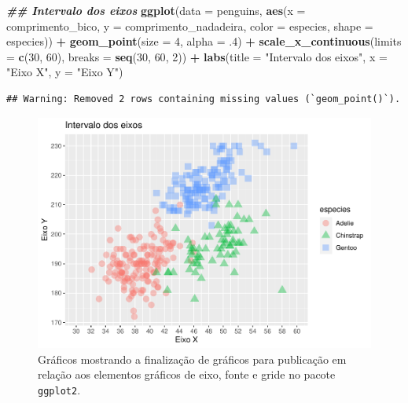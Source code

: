 \documentclass[
]{article}
\newenvironment{Shaded}{\begin{snugshade}}{\end{snugshade}}
\newcommand{\AttributeTok}[1]{\textcolor[rgb]{0.13,0.29,0.53}{#1}}
\newcommand{\DecValTok}[1]{\textcolor[rgb]{0.00,0.00,0.81}{#1}}
\newcommand{\DocumentationTok}[1]{\textcolor[rgb]{0.56,0.35,0.01}{\textbf{\textit{#1}}}}
\newcommand{\FunctionTok}[1]{\textcolor[rgb]{0.13,0.29,0.53}{\textbf{#1}}}
\newcommand{\NormalTok}[1]{#1}
\newcommand{\SpecialCharTok}[1]{\textcolor[rgb]{0.81,0.36,0.00}{\textbf{#1}}}
\newcommand{\StringTok}[1]{\textcolor[rgb]{0.31,0.60,0.02}{#1}}
\begin{document}
\begin{Shaded}
\begin{Highlighting}[]
\DocumentationTok{\#\# Intervalo dos eixos}
\FunctionTok{ggplot}\NormalTok{(}\AttributeTok{data =}\NormalTok{ penguins, }
       \FunctionTok{aes}\NormalTok{(}\AttributeTok{x =}\NormalTok{ comprimento\_bico, }\AttributeTok{y =}\NormalTok{ comprimento\_nadadeira,}
           \AttributeTok{color =}\NormalTok{ especies, }\AttributeTok{shape =}\NormalTok{ especies)) }\SpecialCharTok{+}
    \FunctionTok{geom\_point}\NormalTok{(}\AttributeTok{size =} \DecValTok{4}\NormalTok{, }\AttributeTok{alpha =}\NormalTok{ .}\DecValTok{4}\NormalTok{) }\SpecialCharTok{+}
    \FunctionTok{scale\_x\_continuous}\NormalTok{(}\AttributeTok{limits =} \FunctionTok{c}\NormalTok{(}\DecValTok{30}\NormalTok{, }\DecValTok{60}\NormalTok{), }\AttributeTok{breaks =} \FunctionTok{seq}\NormalTok{(}\DecValTok{30}\NormalTok{, }\DecValTok{60}\NormalTok{, }\DecValTok{2}\NormalTok{)) }\SpecialCharTok{+}
    \FunctionTok{labs}\NormalTok{(}\AttributeTok{title =} \StringTok{"Intervalo dos eixos"}\NormalTok{, }\AttributeTok{x =} \StringTok{"Eixo X"}\NormalTok{, }\AttributeTok{y =} \StringTok{"Eixo Y"}\NormalTok{)}
\end{Highlighting}
\end{Shaded}

\begin{verbatim}
## Warning: Removed 2 rows containing missing values (`geom_point()`).
\end{verbatim}

\begin{figure}
\centering
\includegraphics{epr_files/figure-latex/fig-plot-final-eixos-2.pdf}
\caption{\label{fig:fig-plot-final-eixos-2}Gráficos mostrando a finalização de gráficos para publicação em relação aos elementos gráficos de eixo, fonte e gride no pacote \texttt{ggplot2}.}
\end{figure}
\end{document}
